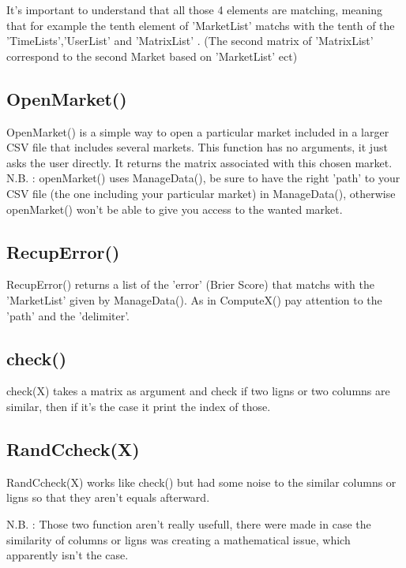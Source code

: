 \documentclass{report}
\begin{document}
It's important to understand that all those 4 elements are matching, meaning that for example the tenth element of 'MarketList' matchs with the tenth of the 'TimeLists','UserList' and 'MatrixList' . (The second matrix of 'MatrixList' correspond to the second Market based on 'MarketList' ect)

\subsection{OpenMarket()}

OpenMarket() is a simple way to open a particular market included in a larger CSV file that includes several markets. This function has no arguments, it just asks the user directly. It returns the matrix associated with this chosen market. \\

N.B. : openMarket() uses ManageData(), be sure to have the right 'path' to your CSV file (the one including your particular market) in ManageData(), otherwise openMarket() won't be able to give you access to the wanted market.

\subsection{RecupError()}

RecupError() returns a list of the 'error' (Brier Score) that matchs with the 'MarketList' given by ManageData(). As in ComputeX() pay attention to the 'path' and the 'delimiter'. 

\subsection{check()}

check(X) takes a matrix as argument and check if two ligns or two columns are similar, then if it's the case it print the index of those.

\subsection{RandCcheck(X)}

RandCcheck(X) works like check() but had some noise to the similar columns or ligns so that they aren't equals afterward.

N.B. : Those two function aren't really usefull, there were made in case the similarity of columns or ligns was creating a mathematical issue, which apparently isn't the case.
\end{document}
